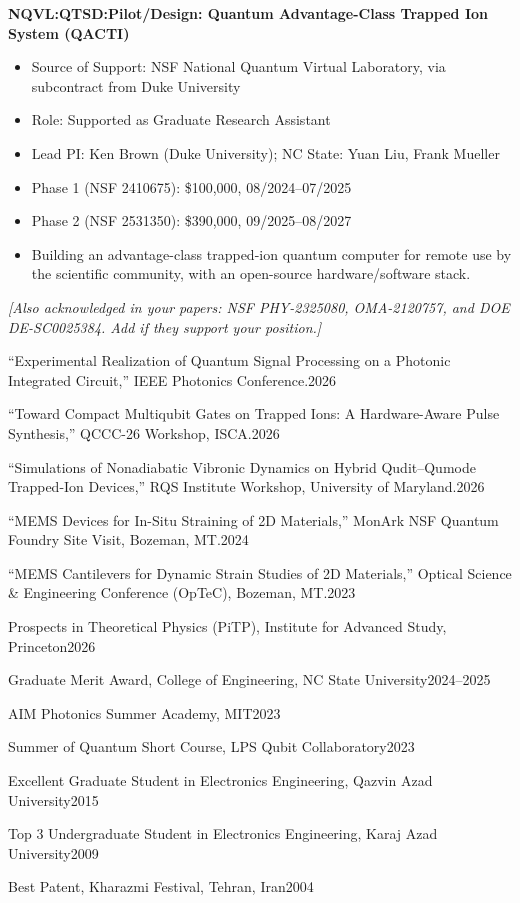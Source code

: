 \documentclass[10.5pt,letterpaper]{article}
\newcommand{\cvsec}[1]{%
  \par\needspace{4\baselineskip}\vspace{11pt}%
  \noindent\makebox[0pt][r]{%
    \smash{\parbox[t]{1.45in}{\raggedright\footnotesize\bfseries\MakeUppercase{#1}}}%
    \hspace{0.30in}}%
  \ignorespaces}
\newcommand{\entry}[2]{#1\hfill #2\par}
\newcommand{\todo}[1]{{\color{gray}\itshape #1}}
\begin{document}
\vspace{7pt}
\textbf{NQVL:QTSD:Pilot/Design: Quantum Advantage-Class Trapped Ion System (QACTI)}
\begin{itemize}
  \item Source of Support: NSF National Quantum Virtual Laboratory, via subcontract from
        Duke University
  \item Role: Supported as Graduate Research Assistant
  \item Lead PI: Ken Brown (Duke University); NC State: Yuan Liu, Frank Mueller
  \item Phase 1 (NSF 2410675): \$100,000, 08/2024--07/2025
  \item Phase 2 (NSF 2531350): \$390,000, 09/2025--08/2027
  \item Building an advantage-class trapped-ion quantum computer for remote use by the
        scientific community, with an open-source hardware/software stack.
\end{itemize}

\vspace{4pt}
\todo{[Also acknowledged in your papers: NSF PHY-2325080, OMA-2120757, and DOE
DE-SC0025384. Add if they support your position.]}

\cvsec{Selected\\Presentations}
\entry{``Experimental Realization of Quantum Signal Processing on a Photonic Integrated
Circuit,'' IEEE Photonics Conference.}{2026}
\entry{``Toward Compact Multiqubit Gates on Trapped Ions: A Hardware-Aware Pulse
Synthesis,'' QCCC-26 Workshop, ISCA.}{2026}
\entry{``Simulations of Nonadiabatic Vibronic Dynamics on Hybrid Qudit--Qumode Trapped-Ion
Devices,'' RQS Institute Workshop, University of Maryland.}{2026}
\entry{``MEMS Devices for In-Situ Straining of 2D Materials,'' MonArk NSF Quantum Foundry
Site Visit, Bozeman, MT.}{2024}
\entry{``MEMS Cantilevers for Dynamic Strain Studies of 2D Materials,'' Optical Science
\& Engineering Conference (OpTeC), Bozeman, MT.}{2023}

\cvsec{Awards and\\Professional\\Programs}
\entry{Prospects in Theoretical Physics (PiTP), Institute for Advanced Study, Princeton}{2026}
\entry{Graduate Merit Award, College of Engineering, NC State University}{2024--2025}
\entry{AIM Photonics Summer Academy, MIT}{2023}
\entry{Summer of Quantum Short Course, LPS Qubit Collaboratory}{2023}
\entry{Excellent Graduate Student in Electronics Engineering, Qazvin Azad University}{2015}
\entry{Top 3 Undergraduate Student in Electronics Engineering, Karaj Azad University}{2009}
\entry{Best Patent, Kharazmi Festival, Tehran, Iran}{2004}
\end{document}
